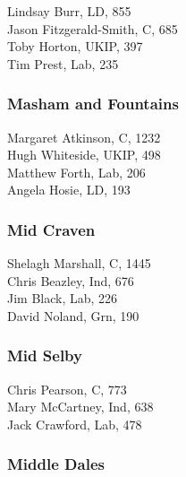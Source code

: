 \documentclass[a4paper,openany,10pt]{book}
\begin{document}


Lindsay Burr, LD, 855\\
Jason Fitzgerald-Smith, C, 685\\
Toby Horton, UKIP, 397\\
Tim Prest, Lab, 235\\


\subsubsection*{Masham and Fountains}



Margaret Atkinson, C, 1232\\
Hugh Whiteside, UKIP, 498\\
Matthew Forth, Lab, 206\\
Angela Hosie, LD, 193\\


\subsubsection*{Mid Craven}



Shelagh Marshall, C, 1445\\
Chris Beazley, Ind, 676\\
Jim Black, Lab, 226\\
David Noland, Grn, 190\\


\subsubsection*{Mid Selby}



Chris Pearson, C, 773\\
Mary McCartney, Ind, 638\\
Jack Crawford, Lab, 478\\


\subsubsection*{Middle Dales}

\end{document}
